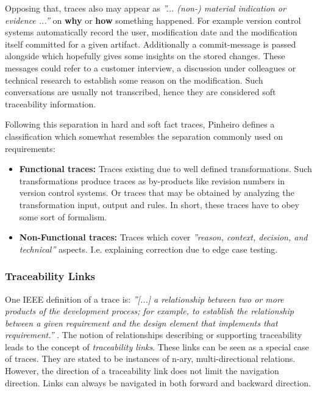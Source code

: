 \documentclass[runningheads,a4paper]{llncs}
\begin{document}
Opposing that, traces also may appear as \textit{''... (non-) material indication or evidence ...''} \cite{OED} on \textbf{why} or \textbf{how} something happened. 
For example version control systems automatically record the user, modification date and the modification itself committed for a given artifact.
Additionally a commit-message is passed alongside which hopefully gives some insights on the stored changes.
These messages could refer to a customer interview, a discussion under colleagues or technical research to establish some reason on the modification\footnotemark.
Such conversations are usually not transcribed, hence they are considered soft traceability information.


Following this separation in hard and soft fact traces, Pinheiro \cite{Pinheiro} defines a classification which somewhat resembles the separation commonly used on requirements:
\begin{itemize}

\item
\textbf{Functional traces:}
Traces existing due to well defined transformations. 
Such transformations produce traces as by-products like revision numbers in version control systems. 
Or traces that may be obtained by analyzing the transformation input, output and rules. 
In short, these traces have to obey some sort of formalism.

\item
\textbf{Non-Functional traces:}
Traces which cover \textit{''reason, context, decision, and technical''} \cite{TraceabilitySurvey} aspects. 
I.e. explaining correction due to edge case testing.

\end{itemize}

\subsubsection{Traceability Links}
\label{subsubsec:Traceability-Links}
One IEEE definition of a trace is:
\textit{''[...] a relationship between two or more products of the development process;
for example, to establish the relationship between a given requirement and the design element that implements that requirement.''} \cite{IEEEGlossary}. 
The notion of relationships describing or supporting traceability leads to the concept of \textit{traceability links}.
These links can be seen as a special case of traces.
They are stated to be instances of n-ary, multi-directional relations. 
However, the direction of a traceability link does not limit the navigation direction. 
Links can always be navigated in both forward and backward direction.
\end{document}
